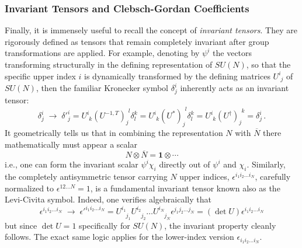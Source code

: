 \subsubsection{Invariant Tensors and Clebsch-Gordan Coefficients}

Finally, it is immensely useful to recall the concept of \textit{invariant tensors}. They are rigorously defined as tensors that remain completely invariant after group transformations are applied. For example, denoting by \(\psi^i\) the vectors transforming structurally in the defining representation of \(SU(N)\), so that the specific upper index \(i\) is dynamically transformed by the defining matrices \(U^i_{\phantom{i}j}\) of \(SU(N)\), then the familiar Kronecker symbol \(\delta^i_j\) inherently acts as an invariant tensor:
\[
    \delta^i_j \;\rightarrow\; \delta'^i_j = U^i_{\phantom{i}k} (U^{-1, T})_j^{\phantom{j}l} \delta^k_l = U^i_{\phantom{i}k} (U^*)_j^{\phantom{j}l} \delta^k_l = U^i_{\phantom{i}k} (U^\dagger)_j^{\phantom{j}k} = \delta^i_j \, .
\]
It geometrically tells us that in combining the representation \(N\) with \(\overline{N}\) there mathematically must appear a scalar
\begin{equation} \label{eq:n_nbar_scalar}
    N \otimes \overline{N} = \mathbf{1} \otimes \cdots
\end{equation}
i.e., one can form the invariant scalar \(\psi^i \chi_i\) directly out of \(\psi^i\) and \(\chi_i\). Similarly, the completely antisymmetric tensor carrying \(N\) upper indices, \(\epsilon^{i_1 i_2 \dots i_N}\), carefully normalized to \(\epsilon^{1 2 \dots N} = 1\), is a fundamental invariant tensor known also as the Levi-Civita symbol. Indeed, one verifies algebraically that
\[
    \epsilon^{i_1 i_2 \dots i_N} \;\rightarrow\; \epsilon'^{i_1 i_2 \dots i_N} = U^{i_1}_{\phantom{i_1}j_1} U^{i_2}_{\phantom{i_2}j_2} \dots U^{i_N}_{\phantom{i_N}j_N} \epsilon^{j_1 j_2 \dots j_N} = (\det U) \epsilon^{i_1 i_2 \dots i_N}
\]
but since \(\det U = 1\) specifically for \(SU(N)\), the invariant property cleanly follows. The exact same logic applies for the lower-index version \(\epsilon_{i_1 i_2 \dots i_N}\).

